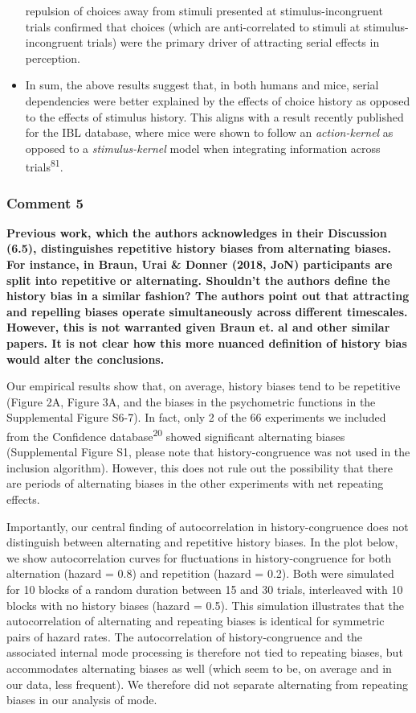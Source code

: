 \documentclass[
]{article}
\begin{document}
\begin{itemize}
  repulsion of choices away from stimuli presented at
  stimulus-incongruent trials confirmed that choices (which are
  anti-correlated to stimuli at stimulus-incongruent trials) were the
  primary driver of attracting serial effects in perception.
\item
  In sum, the above results suggest that, in both humans and mice,
  serial dependencies were better explained by the effects of choice
  history as opposed to the effects of stimulus history. This aligns
  with a result recently published for the IBL database, where mice were
  shown to follow an \emph{action-kernel} as opposed to a
  \emph{stimulus-kernel} model when integrating information across
  trials\textsuperscript{81}.
\end{itemize}

\hypertarget{comment-5-1}{%
\subsubsection{Comment 5}\label{comment-5-1}}

\textbf{Previous work, which the authors acknowledges in their
Discussion (6.5), distinguishes repetitive history biases from
alternating biases. For instance, in Braun, Urai \& Donner (2018, JoN)
participants are split into repetitive or alternating. Shouldn't the
authors define the history bias in a similar fashion? The authors point
out that attracting and repelling biases operate simultaneously across
different timescales. However, this is not warranted given Braun et. al
and other similar papers. It is not clear how this more nuanced
definition of history bias would alter the conclusions.}

Our empirical results show that, on average, history biases tend to be
repetitive (Figure 2A, Figure 3A, and the biases in the psychometric
functions in the Supplemental Figure S6-7). In fact, only 2 of the 66
experiments we included from the Confidence database\textsuperscript{20}
showed significant alternating biases (Supplemental Figure S1, please
note that history-congruence was not used in the inclusion algorithm).
However, this does not rule out the possibility that there are periods
of alternating biases in the other experiments with net repeating
effects.

Importantly, our central finding of autocorrelation in
history-congruence does not distinguish between alternating and
repetitive history biases. In the plot below, we show autocorrelation
curves for fluctuations in history-congruence for both alternation
(hazard = 0.8) and repetition (hazard = 0.2). Both were simulated for 10
blocks of a random duration between 15 and 30 trials, interleaved with
10 blocks with no history biases (hazard = 0.5). This simulation
illustrates that the autocorrelation of alternating and repeating biases
is identical for symmetric pairs of hazard rates. The autocorrelation of
history-congruence and the associated internal mode processing is
therefore not tied to repeating biases, but accommodates alternating
biases as well (which seem to be, on average and in our data, less
frequent). We therefore did not separate alternating from repeating
biases in our analysis of mode.
\end{document}

